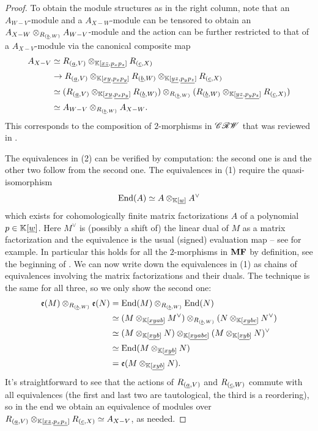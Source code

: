 \begin{proof}
To obtain the module structures as in the right column, note that an $A_{W - V}$-module and a $A_{X - W}$-module can be tensored to obtain an $A_{X - W} \otimes_{R_{(\underline{b}, W)}} A_{W - V}$-module and the action can be further restricted to that of a $A_{X - V}$-module via the canonical composite map
\begin{align*}
	A_{X - V} & \simeq R_{(\underline{a}, V)} \otimes_{\mathbb{K}[\underline{xz}, \underline{p_x p_z}]} R_{(\underline{c}, X)} \\
	& \to R_{(\underline{a}, V)} \otimes_{\mathbb{K}[\underline{xy}, \underline{p_x p_y}]} R_{(\underline{b}, W)} \otimes_{\mathbb{K}[\underline{yz}, \underline{p_y p_z}]} R_{(\underline{c}, X)} \\
	& \simeq (R_{(\underline{a}, V)} \otimes_{\mathbb{K}[\underline{xy}, \underline{p_x p_y}]} R_{(\underline{b}, W)}) \otimes_{R_{(\underline{b}, W)}} (R_{(\underline{b}, W)} \otimes_{\mathbb{K}[\underline{yz}, \underline{p_y p_z}]} R_{(\underline{c}, X)}) \\
	& \simeq A_{W - V} \otimes_{R_{(\underline{b}, W)}} A_{X - W}.
\end{align*}
This corresponds to the composition of $2$-morphisms in $\mathscr{CRW}$ that was reviewed in .

The equivalences in (2) can be verified by computation: the second one is  and the other two follow from the second one. The equivalences in (1) require the quasi-isomorphism
\begin{equation*}
	\mathrm{End}(A) \simeq A \otimes_{\mathbb{K}[\underline{w}]} A^\vee
\end{equation*}
which exists for cohomologically finite matrix factorizations $A$ of a polynomial $p \in \mathbb{K}[\underline{w}]$. Here $M^\vee$ is (possibly a shift of) the linear dual of $M$ as a matrix factorization and the equivalence is the usual (signed) evaluation map -- see \cite[Section 4]{KR2008} for example. In particular this holds for all the $2$-morphisms in $\mathbf{MF}$ by definition, see the beginning of . We can now write down the equivalences in (1) as chains of equivalences involving the matrix factorizations and their duals. The technique is the same for all three, so we only show the second one:
\begin{align*}
	\mathfrak{e}(M) \otimes_{R_{(\underline{b}, W)}} \mathfrak{e}(N) & = \mathrm{End}(M) \otimes_{R_{(\underline{b}, W)}} \mathrm{End}(N) \\
	& \simeq (M \otimes_{\mathbb{K}[\underline{xyab}]} M^\vee) \otimes_{R_{(\underline{b}, W)}} (N \otimes_{\mathbb{K}[\underline{xybc}]} N^\vee) \\
	& \simeq (M \otimes_{\mathbb{K}[\underline{xyb}]} N) \otimes_{\mathbb{K}[\underline{xyabc}]} (M \otimes_{\mathbb{K}[\underline{xyb}]} N)^\vee \\
	& \simeq \mathrm{End}(M \otimes_{\mathbb{K}[\underline{xyb}]} N) \\
	& = \mathfrak{e}(M \otimes_{\mathbb{K}[\underline{xyb}]} N).
\end{align*}
It's straightforward to see that the actions of $R_{(\underline{a}, V)}$ and $R_{(\underline{c}, W)}$ commute with all equivalences (the first and last two are tautological, the third is a reordering), so in the end we obtain an equivalence of modules over $R_{(\underline{a}, V)} \otimes_{\mathbb{K}[\underline{xz}, \underline{p_x p_z}]} R_{(\underline{c}, X)} \simeq A_{X - V}$, as needed.
\end{proof}

